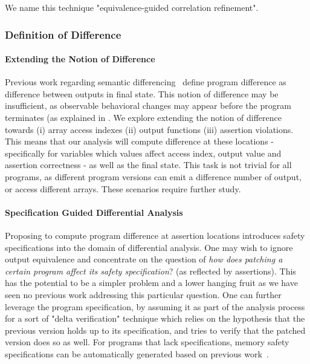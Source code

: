 We name this technique "equivalence-guided correlation refinement".

\subsubsection{Definition of Difference}

\paragraph{Extending the Notion of Difference}
Previous work regarding semantic differencing~\cite{DwyerElbaumPerson08, GodlinStrichman09, EnglerRamos11, HawblitzelKawaguchiLahiriRebelo12} define program difference as difference between outputs in final state. This notion of difference may be insufficient, as observable behavioral changes may appear before the program terminates (as explained in . We explore extending the notion of difference towards (i) array access indexes (ii) output functions (iii) assertion violations. This means that our analysis will compute difference at these locations - specifically for variables which values affect access index, output value and assertion correctness - as well as the final state. This task is not trivial for all programs, as different program versions can emit a difference number of output, or access different arrays. These scenarios require further study.

\paragraph{Specification Guided Differential Analysis}
Proposing to compute program difference at assertion locations introduces safety specifications into the domain of differential analysis. One may wish to ignore output equivalence and concentrate on the question of \emph{how does patching a certain program affect its safety specification}? (as reflected by assertions). This has the potential to be a simpler problem and a lower hanging fruit as we have seen no previous work addressing this particular question. One can further leverage the program specification, by assuming it as part of the analysis process for a sort of "delta verification" technique which relies on the hypothesis that the previous version holds up to its specification, and tries to verify that the patched version does so as well. For programs that lack specifications, memory safety specifications can be automatically generated based on previous work~\cite{ConditHarrenMcPeakNeculaWeimer03}.


